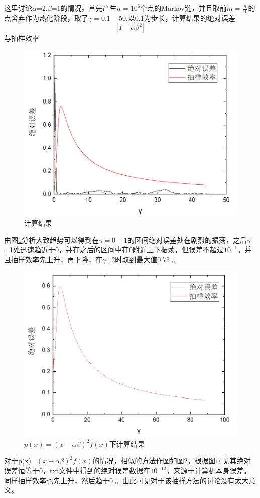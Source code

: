 \documentclass{article}
\begin{document}
	
	这里讨论$\alpha$=2,$\beta$=1的情况。首先产生$ n=10^6 $个点的Markov链，并且取前$ m=\frac{n}{10} $的点舍弃作为热化阶段，取了$ \gamma=0.1-50 $,以0.1为步长，计算结果的绝对误差
	\begin{equation}
		|I-\alpha\beta^2|
	\end{equation}
与抽样效率
	\begin{figure}[!h]
	
	\centering
	\includegraphics[scale=0.6]{error_eff_1}
	\caption{\heiti{}计算结果}
	\label{fig:1}
\end{figure}
由图\ref{fig:1}分析大致趋势可以得到在$ \gamma=0-1 $的区间绝对误差处在剧烈的振荡，之后$\gamma$=1处迅速趋近于0，并在之后的区间中在0附近上下振荡，但误差不超过$ 10^{-1} $。并且抽样效率先上升，再下降，在$\gamma$=2时取到最大值0.75 。


	\begin{figure}[!h]
	
	\centering
	\includegraphics[scale=0.5]{error_p2}
	\caption{\heiti{}$ p(x)= (x-\alpha\beta)^2f(x)$下计算结果}
	\label{fig:2}
\end{figure}
对于p(x)=$ (x-\alpha\beta)^2f(x) $的情况，相似的方法作图如图\ref{fig:2}，根据图可见其绝对误差恒等于0，txt文件中得到的绝对误差数据在$ 10^{-12} $，来源于计算机本身误差。同样抽样效率也先上升，然后趋于0 。由此可见对于该抽样方法的讨论没有太大意义。
\end{document}
